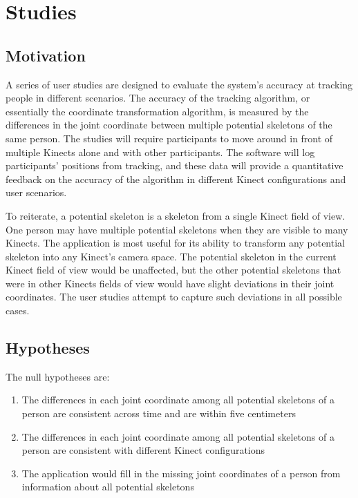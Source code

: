 


\chapter{Studies}

\label{chapter:studies}

\section{Motivation}
\label{sec:studies_motivation}

A series of user studies are designed to evaluate the system's accuracy at tracking people in different scenarios. The accuracy of the tracking algorithm, or essentially the coordinate transformation algorithm, is measured by the differences in the joint coordinate between multiple potential skeletons of the same person. The studies will require participants to move around in front of multiple Kinects alone and with other participants. The software will log participants' positions from tracking, and these data will provide a quantitative feedback on the accuracy of the algorithm in different Kinect configurations and user scenarios.

To reiterate, a potential skeleton is a skeleton from a single Kinect field of view. One person may have multiple potential skeletons when they are visible to many Kinects. The application is most useful for its ability to transform any potential skeleton into any Kinect's camera space. The potential skeleton in the current Kinect field of view would be unaffected, but the other potential skeletons that were in other Kinects fields of view would have slight deviations in their joint coordinates. The user studies attempt to capture such deviations in all possible cases.

\section{Hypotheses}
\label{sec:studies_hypotheses}

The null hypotheses are:

\begin{enumerate}
  \item The differences in each joint coordinate among all potential skeletons of a person are consistent across time and are within five centimeters
  \item The differences in each joint coordinate among all potential skeletons of a person are consistent with different Kinect configurations
  \item The application would fill in the missing joint coordinates of a person from information about all potential skeletons
\end{enumerate}

